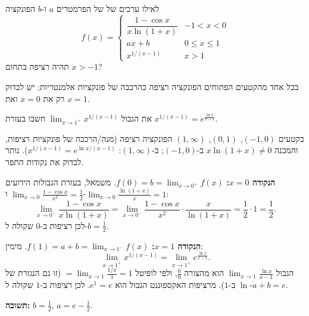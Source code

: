 
\begin{question}
לאילו ערכים של של הפרמטרים $a$ ו-$b$ הפונקציה
\[ f(x)=\begin{cases}\dfrac{1-\cos x}{x\ln(1+x)} & -1<x<0\\[2mm] ax+b & 0\le x\le1\\[1mm] x^{1/(x-1)} & x>1\end{cases} \]
תהיה רציפה בתחום $x>-1$?
\end{question}

\begin{hint}
בכל אחד מהקטעים הפתוחים הפונקציה רציפה כהרכבה של פונקציות אלמנטריות; יש לבדוק רק את $x=0$ ואת $x=1$.
\end{hint}

\begin{hint}
את הגבול $\lim_{x\to1^+}x^{1/(x-1)}$ חשבו בעזרת $x^{1/(x-1)}=e^{\frac{\ln x}{x-1}}$.
\end{hint}

\begin{solution}
בקטעים $(-1,0)$, $(0,1)$, $(1,\infty)$ הפונקציה רציפה (מנה/הרכבה של פונקציות רציפות, והמכנה $x\ln(1+x)\ne0$ ב-$(-1,0)$; ב-$(1,\infty)$: $x^{1/(x-1)}=e^{\ln x/(x-1)}$). נותר לבדוק את נקודות התפר.

\textbf{הנקודה $x=0$:} $f(0)=b=\lim_{x\to0^+}f(x)$. משמאל, בעזרת הגבולות הידועים $\lim_{x\to0}\frac{1-\cos x}{x^2}=\frac12$ ו-$\lim_{x\to0}\frac{\ln(1+x)}{x}=1$:
\[ \lim_{x\to0^-}\frac{1-\cos x}{x\ln(1+x)}=\lim_{x\to0^-}\frac{1-\cos x}{x^2}\cdot\frac{x}{\ln(1+x)}=\frac12\cdot1=\frac12. \]
לכן רציפות ב-$0$ שקולה ל-$b=\frac12$.

\textbf{הנקודה $x=1$:} $f(1)=a+b=\lim_{x\to1^-}f(x)$. מימין:
\[ \lim_{x\to1^+}x^{1/(x-1)}=\lim_{x\to1^+}e^{\frac{\ln x}{x-1}}. \]
הגבול $\lim_{x\to1}\frac{\ln x}{x-1}$ הוא מהצורה $\frac00$, ולפי לופיטל $=\lim_{x\to1}\frac{1/x}{1}=1$ (זו גם הנגזרת של $\ln$ ב-$1$). מרציפות האקספוננט הגבול הוא $e^1=e$. לכן רציפות ב-$1$ שקולה ל-$a+b=e$.

\textbf{תשובה:} $b=\frac12$, $a=e-\frac12$.
\end{solution}
